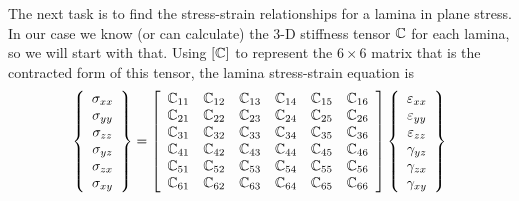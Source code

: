 \documentclass[11pt]{article}
\begin{document}
The next task is to find the stress-strain relationships for a lamina in plane stress.  In our case we know (or can calculate) the 3-D stiffness tensor $\mathbb{C}$ for each lamina, so we will start with that.  Using $[\mathbb{C}]$ to represent the $6 \times 6$ matrix that is the contracted form of this tensor, the lamina stress-strain equation is
\begin{equation}
    \left\{ \begin{array}{c}
           \sigma_{xx}  \\  \sigma_{yy}  \\  \sigma_{zz} \\  \sigma_{yz} \\ \sigma_{zx} \\  \sigma_{xy}
           \end{array} \right\}
           =
              \left[ \begin{array}{cccccc}
     \mathbb{C}_{11} &  \mathbb{C}_{12} &  \mathbb{C}_{13} &  \mathbb{C}_{14} &  \mathbb{C}_{15} &  \mathbb{C}_{16} \\
     \mathbb{C}_{21} &  \mathbb{C}_{22} &  \mathbb{C}_{23} &  \mathbb{C}_{24} &  \mathbb{C}_{25} &  \mathbb{C}_{26} \\
     \mathbb{C}_{31} &  \mathbb{C}_{32} &  \mathbb{C}_{33} &  \mathbb{C}_{34} &  \mathbb{C}_{35} &  \mathbb{C}_{36} \\
     \mathbb{C}_{41} &  \mathbb{C}_{42} &  \mathbb{C}_{43} &  \mathbb{C}_{44} &  \mathbb{C}_{45} &  \mathbb{C}_{46} \\
     \mathbb{C}_{51} &  \mathbb{C}_{52} &  \mathbb{C}_{53} &  \mathbb{C}_{54} &  \mathbb{C}_{55} &  \mathbb{C}_{56} \\
     \mathbb{C}_{61} &  \mathbb{C}_{62} &  \mathbb{C}_{63} &  \mathbb{C}_{64} &  \mathbb{C}_{65} &  \mathbb{C}_{66} 
    \end{array} \right] 
        \left\{ \begin{array}{c}
           \varepsilon_{xx}  \\  \varepsilon_{yy}  \\  \varepsilon_{zz} \\  \gamma_{yz} \\ \gamma_{zx} \\  \gamma_{xy}
           \end{array} \right\}
     \label{stiffnessC}
 \end{equation}
\end{document}
